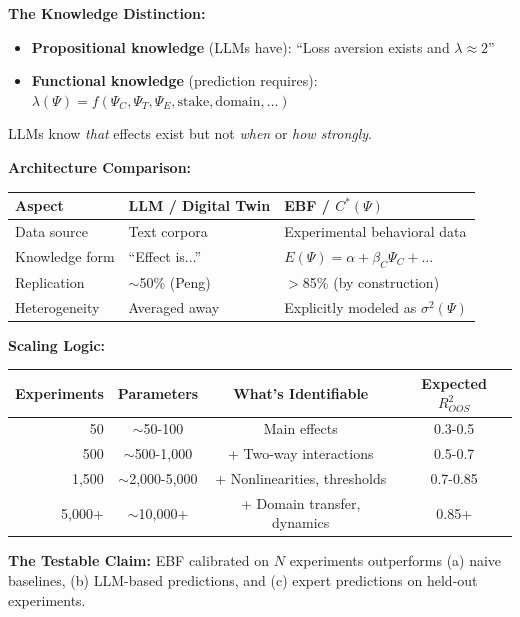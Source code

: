 \textbf{The Knowledge Distinction:}
\begin{itemize}
\item \textbf{Propositional knowledge} (LLMs have): ``Loss aversion exists and $\lambda \approx 2$''
\item \textbf{Functional knowledge} (prediction requires): $\lambda(\Psi) = f(\Psi_C, \Psi_T, \Psi_E, \text{stake}, \text{domain}, \ldots)$
\end{itemize}

LLMs know \textit{that} effects exist but not \textit{when} or \textit{how strongly}.

\textbf{Architecture Comparison:}
\begin{center}
\small
\renewcommand{\arraystretch}{1.2}
\begin{tabular}{@{}lll@{}}
\toprule
\textbf{Aspect} & \textbf{LLM / Digital Twin} & \textbf{EBF / $C^*(\Psi)$} \\
\midrule
Data source & Text corpora & Experimental behavioral data \\
Knowledge form & ``Effect is...'' & $E(\Psi) = \alpha + \beta_C\Psi_C + \ldots$ \\
Replication & $\sim$50\% (Peng) & $>$85\% (by construction) \\
Heterogeneity & Averaged away & Explicitly modeled as $\sigma^2(\Psi)$ \\
\bottomrule
\end{tabular}
\end{center}

\textbf{Scaling Logic:}
\begin{center}
\small
\renewcommand{\arraystretch}{1.2}
\begin{tabular}{rccc}
\toprule
\textbf{Experiments} & \textbf{Parameters} & \textbf{What's Identifiable} & \textbf{Expected $R^2_{OOS}$} \\
\midrule
50 & $\sim$50-100 & Main effects & 0.3-0.5 \\
500 & $\sim$500-1,000 & + Two-way interactions & 0.5-0.7 \\
1,500 & $\sim$2,000-5,000 & + Nonlinearities, thresholds & 0.7-0.85 \\
5,000+ & $\sim$10,000+ & + Domain transfer, dynamics & 0.85+ \\
\bottomrule
\end{tabular}
\end{center}

\textbf{The Testable Claim:} EBF calibrated on $N$ experiments outperforms (a) naive baselines,
(b) LLM-based predictions, and (c) expert predictions on held-out experiments.

